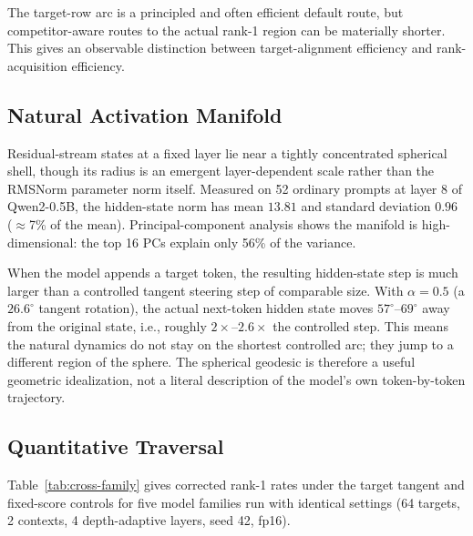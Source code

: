 \documentclass{article}
\begin{document}
The target-row arc is a principled and often efficient default route, but
competitor-aware routes to the actual rank-1 region can be materially shorter.
This gives an observable distinction between target-alignment efficiency and
rank-acquisition efficiency.

\subsection{Natural Activation Manifold}

Residual-stream states at a fixed layer lie near a tightly concentrated
spherical shell, though its radius is an emergent layer-dependent scale rather
than the RMSNorm parameter norm itself. Measured on 52 ordinary prompts at
layer 8 of Qwen2-0.5B, the hidden-state norm has mean $13.81$ and standard
deviation $0.96$ ($\approx$7\% of the mean). Principal-component analysis
shows the manifold is high-dimensional: the top 16 PCs explain only 56\% of
the variance.

When the model appends a target token, the resulting hidden-state step is much
larger than a controlled tangent steering step of comparable size. With
$\alpha=0.5$ (a $26.6^\circ$ tangent rotation), the actual next-token hidden
state moves $57^\circ$--$69^\circ$ away from the original state, i.e., roughly
$2\times$--$2.6\times$ the controlled step. This means the natural dynamics do
not stay on the shortest controlled arc; they jump to a different region of the
sphere. The spherical geodesic is therefore a useful geometric idealization, not
a literal description of the model's own token-by-token trajectory.

\subsection{Quantitative Traversal}

Table~\ref{tab:cross-family} gives corrected rank-1 rates under the target
tangent and fixed-score controls for five model families run with identical
settings (64 targets, 2 contexts, 4 depth-adaptive layers, seed 42, fp16).
\end{document}
